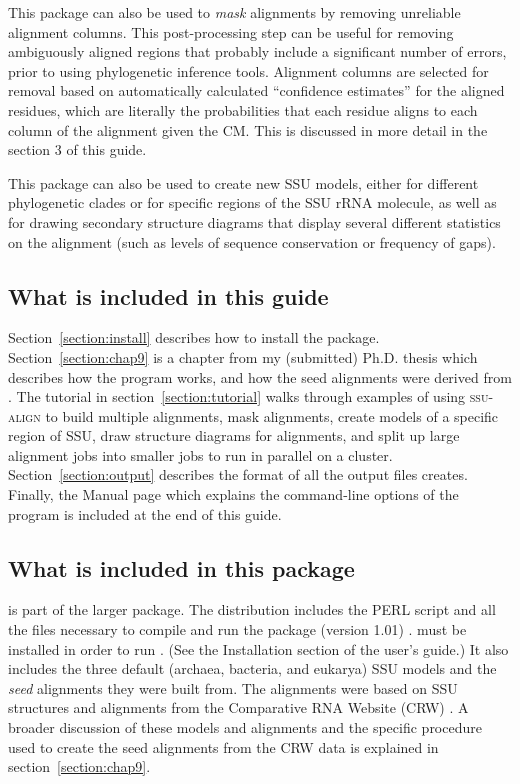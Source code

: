This package can also be used to \emph{mask} alignments by removing
unreliable alignment columns. This post-processing step can be useful
for removing ambiguously aligned regions that probably include a
significant number of errors, prior to using phylogenetic inference
tools.  Alignment columns are selected for removal based on
automatically calculated ``confidence estimates'' for the aligned
residues, which are literally the probabilities that each residue aligns
to each column of the alignment given the CM. This is discussed in
more detail in the section 3 of this guide.

This package can also be used to create new SSU models, either for
different phylogenetic clades or for specific regions of the SSU rRNA
molecule, as well as for drawing secondary structure diagrams that
display several different statistics on the alignment (such as levels
of sequence conservation or frequency of gaps). 

\subsection{What is included in this guide}

Section~\ref{section:install} describes how to install the
package. Section~\ref{section:chap9} is a chapter from my (submitted)
Ph.D. thesis \cite{Nawrocki09b} which describes how the program works,
and how the seed alignments were derived from 
\cite{CannoneGutell02}.  The tutorial in
section~\ref{section:tutorial} walks through examples of using
\textsc{ssu-align} to build multiple alignments, mask alignments,
create models of a specific region of SSU, draw structure diagrams for
alignments, and split up large alignment jobs into smaller jobs to run
in parallel on a cluster.  Section~\ref{section:output} describes the
format of all the output files  creates. Finally, the
 Manual page which explains the command-line options of
the program is included at the end of this guide.

\subsection{What is included in this package}

 is part of the larger  package. The
 distribution includes the PERL script
 and all the files necessary to compile and run
the  package (version 1.01)
\cite{Nawrocki09}.  must be installed in order to
run .  (See the Installation section of the
 user's guide.) It also includes the three default
(archaea, bacteria, and eukarya) SSU models and the \emph{seed}
alignments they were built from. The alignments were based on SSU
structures and alignments from the Comparative RNA Website (CRW)
\cite{CannoneGutell02}. A broader discussion of these models and alignments
and the specific procedure used to create the seed alignments from the
CRW data is explained in section~\ref{section:chap9}.

